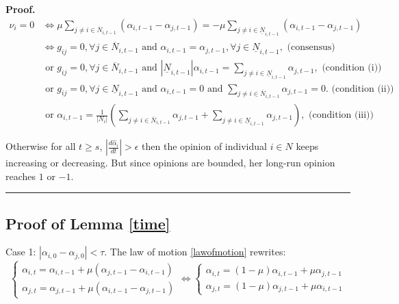 \documentclass{article}
\newenvironment{proof}[1][Proof]{\textbf{#1.} }{\ \rule{0.5em}{0.5em}}
\begin{document}
\begin{proof}
\begin{align}
\nu_i = 0 & \Leftrightarrow \mu \sum \limits_{j \neq i \in \overline{N}_{i,t-1}} ( \alpha_{i,t-1} - \alpha_{j,t-1}) = - \mu \sum \limits_{j \neq i \in \underline{N}_{i,t-1}} ( \alpha_{i,t-1} - \alpha_{j,t-1}) \\
& \Leftrightarrow g_{ij}=0, \forall j \in  \overline{N}_{i,t-1} \text{ and } \alpha_{i,t-1} = \alpha_{j,t-1}, \forall j \in  \underline{N}_{i,t-1}, \text{ (consensus)} \\
& \text{ or }  g_{ij}=0, \forall j \in  \overline{N}_{i,t-1} \text{ and } |\underline{N}_{i,t-1} |\alpha_{i,t-1} = \sum  \limits_{j \neq i \in \underline{N}_{i,t-1}} \alpha_{j,t-1}, \text{ (condition (i))} \\
& \text{ or }  g_{ij}=0, \forall j \in  \underline{N}_{i,t-1} \text{ and } \alpha_{i,t-1} = 0 \text{ and } \sum \limits_{j \neq i \in \overline{N}_{i,t-1}}  \alpha_{j,t-1} = 0. \text{ (condition (ii))}  \\
& \text{ or }  \alpha_{i,t-1} = \frac{1}{|N_i|} ( \sum  \limits_{j \neq i \in \overline{N}_{i,t-1}} \alpha_{j,t-1} + \sum  \limits_{j \neq i \in \underline{N}_{i,t-1}} \alpha_{j,t-1}), \text{ (condition (iii))} 
\end{align}

\noindent Otherwise for all $t \geq s$, $|\frac{d \hat{\alpha}_i}{dt}|> \epsilon$ then the opinion of individual $i \in N$ keeps increasing or decreasing. But since opinions are bounded, her long-run opinion reaches $1$ or $-1$.
\end{proof}

\subsection{Proof of Lemma \ref{time}} \label{prooftime} 

{Case 1: $|\alpha_{i,0} - \alpha_{j,0}| < \tau $.} The law of motion \ref{lawofmotion} rewrites:
\begin{equation*}
	\begin{cases}
		\alpha_{i,t} = \alpha_{i,t-1} + \mu (\alpha_{j,t-1} - \alpha_{i,t-1}) \\
		\alpha_{j,t} = \alpha_{j,t-1} + \mu (\alpha_{i,t-1} - \alpha_{j,t-1})
	\end{cases}
\Leftrightarrow
	\begin{cases}
		\alpha_{i,t} = (1 - \mu) \alpha_{i,t-1} + \mu \alpha_{j,t-1}  \\
		\alpha_{j,t} = (1 - \mu) \alpha_{j,t-1} + \mu \alpha_{i,t-1} 	\end{cases}
\end{equation*}
\end{document}
